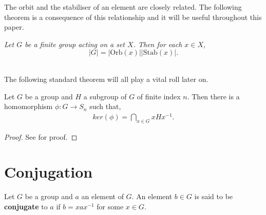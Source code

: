 The orbit and the stabiliser of an element are closely related. The following theorem is a consequence of this relationship and it will be useful throughout this paper. \\

\begin{theorem} 
    \textit{Let $G$ be a finite group acting on a set $X$. Then for each $x \in X$}, $$|G| = |\text{Orb}(x)| |\text{Stab}(x)|.$$ \\
\end{theorem}

The following standard theorem will all play a vital roll later on.

\begin{theorem}\label{symhomoker} Let $G$ be a group and $H$ a subgroup of $G$ of finite index $n$. Then there is a homomorphism $\phi : G \longrightarrow S_n$ such that,
\begin{align*} ker(\phi) = \bigcap\limits_{x \in G} x H x^{-1}.
\end{align*}
\end{theorem}

\begin{proof} See \cite[p.110]{bhattacharya} for proof.
\end{proof}

\section{Conjugation}

\begin{definition}
\label{IsConj}
Let $G$ be a group and $a$ an element of $G$. An element $b \in G$ is said to be \textbf{conjugate} to $a$ if $b=xax^{-1}$ for some $x \in G$. \\
\end{definition}

